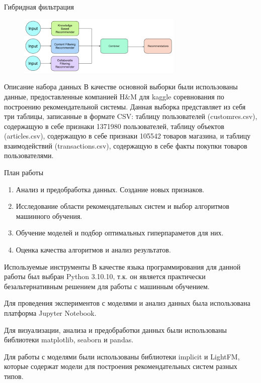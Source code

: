 \documentclass{beamer}
\begin{document}
\begin{frame}{Гибридная фильтрация}
  \begin{figure}[H]
    \centering
    \includegraphics[width=0.7\textwidth]{4}
    \label{fig:img1}
  \end{figure}  
\end{frame}

\begin{frame}{Описание набора данных}
  В качестве основной выборки были использованы данные, предоставленные компанией H\&M для kaggle соревнования по построению рекомендательной системы. Данная выборка
  представляет из себя три таблицы, записанные в формате CSV: таблицу пользователей (customres.csv), содержащую в себе признаки 1371980 пользователей, таблицу объектов (articles.csv),
  содержащую в себе признаки 105542 товаров магазина, и таблицу взаимодействий (transactions.csv), содержащую в себе факты покупки товаров пользователями.  
\end{frame}

\begin{frame}{План работы}
  \begin{enumerate}
    \item Анализ и предобработка данных. Создание новых признаков.
    \item Исследование области рекомендательных систем и выбор алгоритмов машинного обучения.
    \item Обучение моделей и подбор оптимальных гиперпараметов для них.
    \item Оценка качества алгоритмов и анализ результатов.
  \end{enumerate}
\end{frame}

\begin{frame}{Используемые инструменты}
  В качестве языка программирования для данной работы был выбран Python 3.10.10, т.к. он является
  практически безальтернативным решением для работы с машинным обучением.
  
  Для проведения экспериментов с моделями и анализ данных была использована платформа Jupyter Notebook.

  Для визуализации, анализа и предобработки данных были использованы библиотеки matplotlib, seaborn и pandas.

  Для работы с моделями были использованы библиотеки implicit и LightFM, которые содержат модели для построения рекомендательных систем разных типов.
\end{frame}
\end{document}
